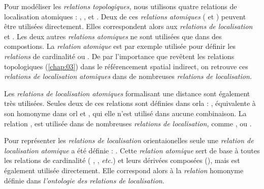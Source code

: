 Pour modéliser les \emph{relations topologiques,} nous utilisons
quatre relations de localisation atomiques :
,
,
 et . Deux de
ces \emph{relations atomiques} ( et
) peuvent être utilisées
directement. Elles correspondent alors aux \emph{relations de
  localisation}  et
. Les deux autres \emph{relations
  atomiques} ne sont utilisées que dans des compostions. La
\emph{relation atomique}  est par
exemple utilisée pour définir les \emph{relations} de cardinalité
 ou
. De par l'importance que
revêtent les relations topologiques (\autoref{chap:03}) dans le
référencement spatial indirect, on retrouve ces \emph{relations de
  localisation atomiques} dans de nombreuses \emph{relations de
  localisation.}

Les \emph{relations de localisation atomiques} formalisant une
distance sont également très utilisées. Seules deux de ces relations
sont définies dans \ac{orla}
: ,
équivalente à son homonyme dans \ac{orl} et
, qui elle n'est utilisé dans
aucune combinaison. La relation
,
est utilisée dans de nombreuses \emph{relations de localisation,}
comme ,  ou
.

Pour représenter les \emph{relations de localisation} orientaionelles
seule une \emph{relation de localisation atomique} a été définie :
. Cette \emph{relation atomique}
sert de base à toutes les relations de cardinalité (\ie
{}, , \emph{etc.}) et
leurs dérivées composées (\eg {}),
mais est également utilisée directement. Elle correspond alors à la
\emph{relation} homonyme définie dans \emph{l'ontologie des relations
  de localisation}.

